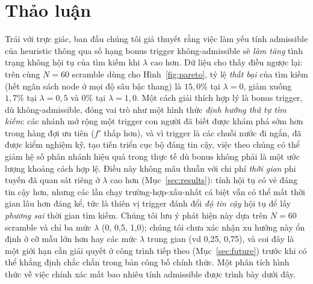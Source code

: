 \documentclass[10pt,conference]{article}
\begin{document}
\section{Thảo luận}
\label{sec:discussion}
Trái với trực giác, ban đầu chúng tôi giả thuyết rằng việc làm yếu tính
admissible của heuristic thông qua số hạng bonus trigger không-admissible
sẽ \emph{làm tăng} tình trạng không hội tụ của tìm kiếm khi $\lambda$
cao hơn. Dữ liệu cho thấy điều ngược lại: trên cùng $N=60$ scramble
dùng cho Hình~\ref{fig:pareto}, tỷ lệ \emph{thất bại} của tìm kiếm (hết
ngân sách node ở mọi độ sâu bậc thang) là $15,0\%$ tại $\lambda=0$,
giảm xuống $1,7\%$ tại $\lambda=0,5$ và $0\%$ tại $\lambda=1,0$. Một
cách giải thích hợp lý là bonus trigger, dù không-admissible, đóng vai
trò như một hình thức \emph{định hướng thứ tự tìm kiếm}: các nhánh mở
rộng một trigger con người đã biết được khám phá sớm hơn trong hàng đợi
ưu tiên ($f'$ thấp hơn), và vì trigger là các chuỗi nước đi ngắn, đã
được kiểm nghiệm kỹ, tạo tiến triển cục bộ đáng tin cậy, việc theo
chúng có thể giảm hệ số phân nhánh hiệu quả trong thực tế dù bonus
không phải là một ước lượng khoảng cách hợp lệ. Điều này không mâu
thuẫn với chi phí \emph{thời gian} phi tuyến đã quan sát riêng ở
$\lambda$ cao hơn (Mục~\ref{sec:results}): tính hội tụ có vẻ đáng tin
cậy hơn, nhưng các lần chạy trường-hợp-xấu-nhất cá biệt vẫn có thể mất
thời gian lâu hơn đáng kể, tức là thiên vị trigger đánh đổi \emph{độ
tin cậy} hội tụ để lấy \emph{phương sai} thời gian tìm kiếm.
Chúng tôi lưu ý phát hiện này dựa trên $N=60$ scramble và chỉ ba mức
$\lambda$ (0, 0,5, 1,0); chúng tôi chưa xác nhận xu hướng này ổn định
ở cỡ mẫu lớn hơn hay các mức $\lambda$ trung gian (vd 0,25, 0,75), và
coi đây là một giới hạn cần giải quyết ở công trình tiếp theo
(Mục~\ref{sec:future}) trước khi có thể khẳng định chắc chắn trong bản
công bố chính thức. Một phân tích hình thức về việc chính xác mất bao
nhiêu tính admissible được trình bày dưới đây.
\end{document}
